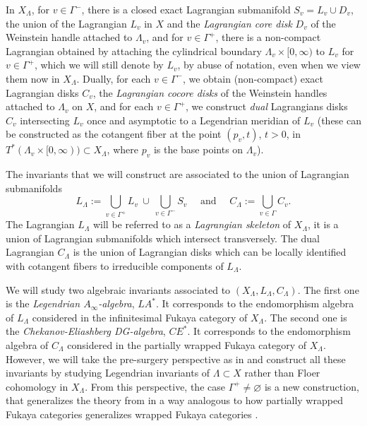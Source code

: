 \documentclass{gtpart}
\begin{document}
In $X_\Lambda$, for $v\in \Gamma^{-}$, there is a closed exact Lagrangian submanifold $S_v = L_v \cup D_v$, the union of the Lagrangian $L_v$
in $X$ and the \emph{Lagrangian core disk} $D_v$ of the Weinstein handle attached to $\Lambda_v$, and for $v \in \Gamma^+$, there is a non-compact Lagrangian obtained by attaching the cylindrical boundary
$\Lambda_v \times [0,\infty)$ to $L_v$ for $v \in \Gamma^+$, which we will still denote by $L_v$, by
abuse of notation, even when we view them now in $X_\Lambda$. Dually, for each $v \in \Gamma^-$, we obtain (non-compact) exact Lagrangian disks $C_v$, the \emph{Lagrangian cocore disks} of the Weinstein handles attached to $\Lambda_v$ on $X$, and for each $v \in
\Gamma^+$, we construct \emph{dual} Lagrangians disks $C_v$ intersecting $L_v$ once and asymptotic to a Legendrian meridian of $L_v$ (these can be constructed
as the cotangent fiber at the point $(p_{v},t)$, $t>0$, in $T^*(\Lambda_v \times [0,\infty)) \subset X_\Lambda$, where $p_v$ is the base points on $\Lambda_v$). 

The invariants that we will construct are associated to the union of Lagrangian submanifolds 
\[ 
L_\Lambda := \bigcup_{v \in \Gamma^{+}} L_v \ \cup \ \bigcup_{v \in \Gamma^{-}} S_v  \quad\text{\ \ \ and\ \ \   }\quad
C_\Lambda := \bigcup_{v \in \Gamma} C_v. 
\] 
The Lagrangian $L_\Lambda$ will be referred to as a \emph{Lagrangian skeleton} of $X_\Lambda$, it
is a union of Lagrangian submanifolds which intersect transversely. The dual Lagrangian
$C_\Lambda$ is the union of Lagrangian disks which can be locally identified with cotangent fibers to irreducible components of $L_\Lambda$. 

We will study two algebraic invariants associated to $(X_\Lambda, L_\Lambda, C_\Lambda)$. The first
one is the \emph{Legendrian $A_\infty$-algebra}, $LA^*$. It corresponds to the endomorphism algebra of
$L_\Lambda$ considered in the infinitesimal Fukaya category of $X_{\Lambda}$. The second one is
the \emph{Chekanov-Eliashberg DG-algebra}, $CE^*$. It corresponds to the endomorphism algebra of $C_\Lambda$ considered in the partially wrapped Fukaya category of $X_{\Lambda}$. However, 
we will take the pre-surgery perspective as in \cite{BEE} and construct all these invariants by
studying Legendrian invariants of $\Lambda\subset X$ rather than Floer cohomology in $X_\Lambda$. From this perspective, the case $\Gamma^+ \neq \varnothing$ is a new construction, that generalizes the theory from \cite{BEE} in a way analogous to how partially wrapped Fukaya categories \cite{sylvan} generalizes wrapped Fukaya categories \cite{AbouzSeidel}. 
\end{document}
